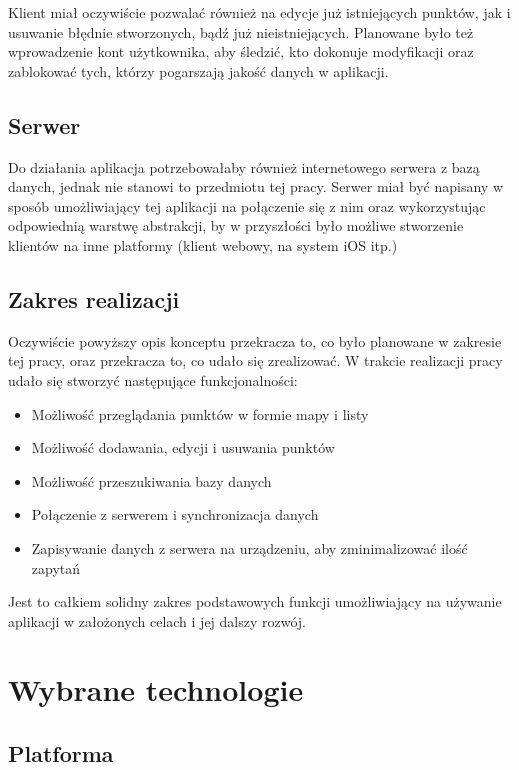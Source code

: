 \documentclass[polish,polish,a4paper,12pt]{article}
\let\sectioncmd\section
\renewcommand{\section}{\clearpage\sectioncmd}
\begin{document}
	Klient miał oczywiście pozwalać również na edycje już istniejących punktów, jak i usuwanie błędnie stworzonych, bądź już nieistniejących. Planowane było też wprowadzenie kont użytkownika, aby śledzić, kto dokonuje modyfikacji oraz zablokować tych, którzy pogarszają jakość danych w aplikacji.

	\subsection{Serwer}

	Do działania aplikacja potrzebowałaby również internetowego serwera z bazą danych, jednak nie stanowi to przedmiotu tej pracy. Serwer miał być napisany w sposób umożliwiający tej aplikacji na połączenie się z nim oraz wykorzystując odpowiednią warstwę abstrakcji, by w przyszłości było możliwe stworzenie klientów na inne platformy (klient webowy, na system iOS itp.)

	\subsection{Zakres realizacji}

	Oczywiście powyższy opis konceptu przekracza to, co było planowane w zakresie tej pracy, oraz przekracza to, co udało się zrealizować. W trakcie realizacji pracy udało się stworzyć następujące funkcjonalności:

	\begin{itemize}
		\item Możliwość przeglądania punktów w formie mapy i listy
		\item Możliwość dodawania, edycji i usuwania punktów
		\item Możliwość przeszukiwania bazy danych
		\item Połączenie z serwerem i synchronizacja danych
		\item Zapisywanie danych z serwera na urządzeniu, aby zminimalizować ilość zapytań
	\end{itemize}

	Jest to całkiem solidny zakres podstawowych funkcji umożliwiający na używanie aplikacji w założonych celach i jej dalszy rozwój.

\section{Wybrane technologie}\label{technology}
	\subsection{Platforma}
\end{document}
